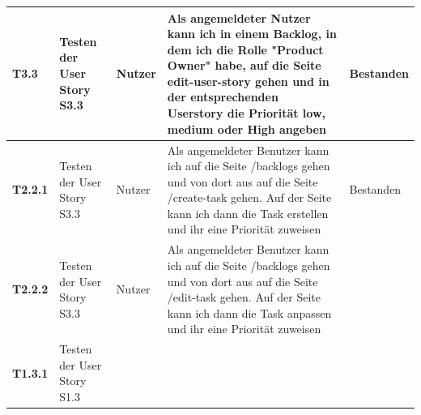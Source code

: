 \documentclass[a4paper,11pt]{article}
\begin{document}
\begin{longtable}{|p{3.3cm}|p{3.3cm}|p{3.3cm}|p{5.5cm}|p{3.3cm}|}
	\textbf{T3.3} &                                                                                                                                                                                    
	Testen der User Story S3.3 &                                                                                                                                                                    
	Nutzer &                                                                                                                                                                                             
	Als angemeldeter Nutzer kann ich in einem Backlog, in dem ich die Rolle "Product Owner" habe, auf die Seite edit-user-story gehen und in der entsprechenden Userstory die Priorität low, medium oder High angeben &
	Bestanden
	\\
	\hline
	\textbf{T2.2.1} &                                                                                                                                                                                    
	Testen der User Story S3.3 &                                                                                                                                                                    
	Nutzer &                                                                                                                                                                                             
	Als angemeldeter Benutzer kann ich auf die Seite /backlogs gehen und von dort aus auf die Seite /create-task gehen. Auf der Seite kann ich dann die Task erstellen und ihr eine Priorität zuweisen &
	Bestanden
	\\
	\hline
	\textbf{T2.2.2} &                                                                                                                                                                                    
	Testen der User Story S3.3 &                                                                                                                                                                    
	Nutzer &                                                                                                                                                                                             
	Als angemeldeter Benutzer kann ich auf die Seite /backlogs gehen und von dort aus auf die Seite /edit-task gehen. Auf der Seite kann ich dann die Task anpassen und ihr eine Priorität zuweisen &
		\\
	\hline
	\textbf{T1.3.1} &
	Testen der User Story S1.3 &

\end{longtable}
\end{document}
